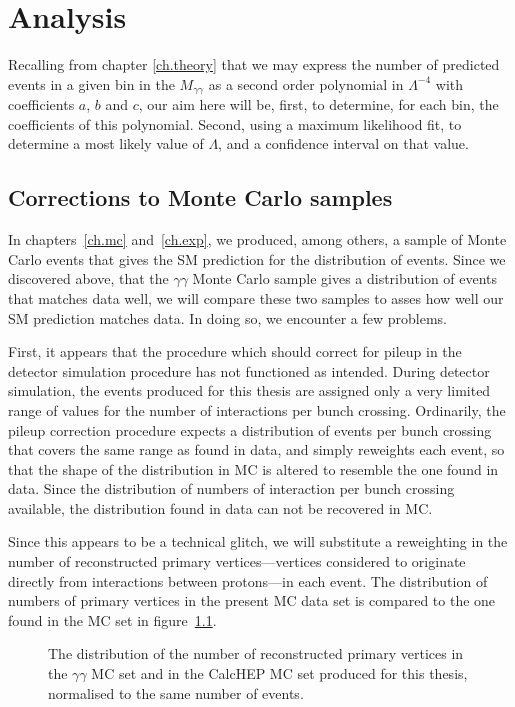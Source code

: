 \chapter{Analysis}\label{ch.an}

Recalling from chapter \ref{ch.theory} that we may express the number of predicted events in a given bin in the $M_{\gamma\gamma}$ as a second order polynomial in $\Lambda^{-4}$ with coefficients $a$, $b$ and $c$, our aim here will be, first, to determine, for each bin, the coefficients of this polynomial. Second, using a maximum likelihood fit, to determine a most likely value of $\Lambda$, and a confidence interval on that value.

\section{Corrections to Monte Carlo samples}

In chapters~\ref{ch.mc} and~\ref{ch.exp}, we produced, among others, a sample of Monte Carlo events that gives the SM prediction for the distribution of events. Since we discovered above, that the \atlas{} $\gamma\gamma$ Monte Carlo sample gives a distribution of events that matches data well, we will compare these two samples to asses how well our SM prediction matches data. In doing so, we encounter a few problems.

First, it appears that the procedure which should correct for pileup in the detector simulation procedure has not functioned as intended. During detector simulation, the events produced for this thesis are assigned only a very limited range of values for the number of interactions per bunch crossing. Ordinarily, the pileup correction procedure expects a distribution of events per bunch crossing that covers the same range as found in data, and simply reweights each event, so that the shape of the distribution in MC is altered to resemble the one found in data. Since the distribution of numbers of interaction per bunch crossing available, the distribution found in data can not be recovered in MC.

Since this appears to be a technical glitch, we will substitute a reweighting in the number of reconstructed primary vertices---vertices considered to originate directly from interactions between protons---in each event. The distribution of numbers of primary vertices in the present MC data set is compared to the one found in the \atlas{} MC set in figure~\ref{pvnnone}.

\begin{figure}[htp]
\begin{minipage}[b]{.69\textwidth}
\begin{infilsf} \tiny

\end{infilsf}
\end{minipage}
\begin{minipage}[b]{.3\textwidth}
\caption{The distribution of the number of reconstructed primary vertices in the \atlas{} $\gamma\gamma$ MC set and in the CalcHEP MC set produced for this thesis, normalised to the same number of events.}\label{pvnnone}
\end{minipage}
\end{figure}


